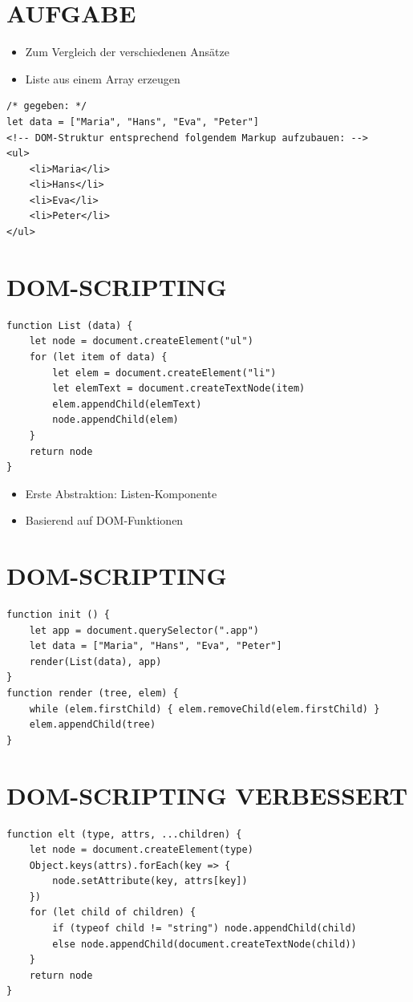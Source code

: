 \documentclass[10pt]{article}
\begin{document}
\section*{AUFGABE}
\begin{itemize}
  \item Zum Vergleich der verschiedenen Ansätze
  \item Liste aus einem Array erzeugen
\end{itemize}

\begin{verbatim}
/* gegeben: */
let data = ["Maria", "Hans", "Eva", "Peter"]
<!-- DOM-Struktur entsprechend folgendem Markup aufzubauen: -->
<ul>
    <li>Maria</li>
    <li>Hans</li>
    <li>Eva</li>
    <li>Peter</li>
</ul>
\end{verbatim}

\section*{DOM-SCRIPTING}
\begin{verbatim}
function List (data) {
    let node = document.createElement("ul")
    for (let item of data) {
        let elem = document.createElement("li")
        let elemText = document.createTextNode(item)
        elem.appendChild(elemText)
        node.appendChild(elem)
    }
    return node
}
\end{verbatim}

\begin{itemize}
  \item Erste Abstraktion: Listen-Komponente
  \item Basierend auf DOM-Funktionen
\end{itemize}

\section*{DOM-SCRIPTING}
\begin{verbatim}
function init () {
    let app = document.querySelector(".app")
    let data = ["Maria", "Hans", "Eva", "Peter"]
    render(List(data), app)
}
function render (tree, elem) {
    while (elem.firstChild) { elem.removeChild(elem.firstChild) }
    elem.appendChild(tree)
}
\end{verbatim}

\section*{DOM-SCRIPTING VERBESSERT}
\begin{verbatim}
function elt (type, attrs, ...children) {
    let node = document.createElement(type)
    Object.keys(attrs).forEach(key => {
        node.setAttribute(key, attrs[key])
    })
    for (let child of children) {
        if (typeof child != "string") node.appendChild(child)
        else node.appendChild(document.createTextNode(child))
    }
    return node
}
\end{verbatim}
\end{document}
